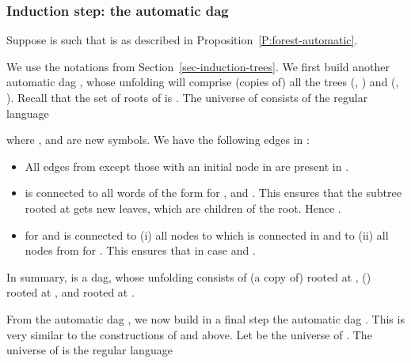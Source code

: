 \documentclass[envcountsame]{llncs}
\begin{document}
\subsubsection{Induction step: the automatic dag }
\label{sec-induction-automatic-trees}

Suppose  is such that  is as described in Proposition~\ref{P:forest-automatic}.

We use the notations from Section~\ref{sec-induction-trees}. We first
build another automatic dag , whose unfolding will comprise (copies
of) all the trees  (, ) and  (, ).
Recall that the set of roots of  is
.
The universe of  consists of the regular language

where , and  are new symbols.
We have the following edges in :
\begin{itemize}
\item All edges from  except those with an initial node in 
are present in .
\item  is connected to all words of the form
 for , and .
This ensures that the subtree rooted at  gets  new leaves,
which are children of the root. Hence .
\item  for  and 
 is connected  to (i) all nodes to which  is connected
in  and  to (ii) all nodes from  for .
This ensures that  in case  and .
\end{itemize}
In summary,  is a dag, whose unfolding
consists of (a copy
of)  rooted at ,  ()
rooted at , and  rooted at
.

{}From the automatic dag , we now build in a final step
the automatic dag . This is very similar to the
constructions of  and  above.
Let  be the universe of .
The universe of  is the regular language
\end{document}

